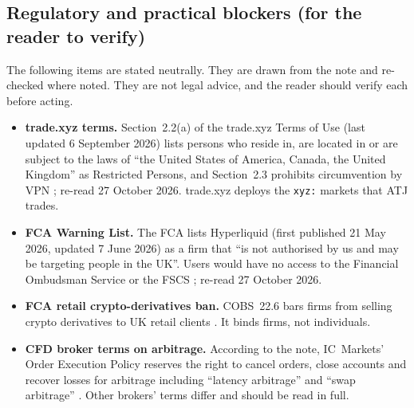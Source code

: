 \documentclass[11pt,a4paper]{article}
\begin{document}
\subsection{Regulatory and practical blockers (for the reader to verify)}
The following items are stated neutrally. They are drawn from the note and re-checked where noted. They are not legal advice, and the reader should verify each before acting.
\begin{itemize}
\item \textbf{trade.xyz terms.} Section~2.2(a) of the trade.xyz Terms of Use (last updated 6 September 2026) lists persons who reside in, are located in or are subject to the laws of ``the United States of America, Canada, the United Kingdom'' as Restricted Persons, and Section~2.3 prohibits circumvention by VPN \citep{tradexyz_terms}; re-read 27 October 2026. trade.xyz deploys the \texttt{xyz:} markets that ATJ trades.
\item \textbf{FCA Warning List.} The FCA lists Hyperliquid (first published 21 May 2026, updated 7 June 2026) as a firm that ``is not authorised by us and may be targeting people in the UK''. Users would have no access to the Financial Ombudsman Service or the FSCS \citep{fca_hl}; re-read 27 October 2026.
\item \textbf{FCA retail crypto-derivatives ban.} COBS~22.6 bars firms from selling crypto derivatives to UK retail clients \citep{fca_cobs226}. It binds firms, not individuals.
\item \textbf{CFD broker terms on arbitrage.} According to the note, IC~Markets' Order Execution Policy reserves the right to cancel orders, close accounts and recover losses for arbitrage including ``latency arbitrage'' and ``swap arbitrage'' \citep{icm_oep}. Other brokers' terms differ and should be read in full.
\end{itemize}

\end{document}
